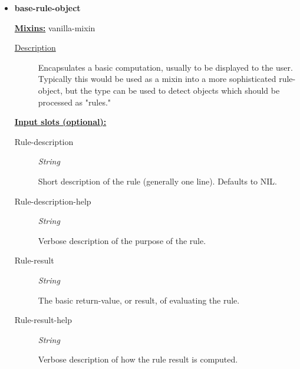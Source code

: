 \documentclass [11pt]{book}
\begin{document}
\begin{itemize}

\item {}
\label{prim:base-rule-object}
\textbf{base-rule-object}


\textbf{
\underline{Mixins:}} vanilla-mixin





\begin{description}

\item [
\underline{Description}]


Encapsulates a basic computation, usually to be displayed to the user.
Typically this would be used as a mixin into a more sophisticated rule-object, but the type can be
 used to detect objects which should be processed as "rules."



\end{description}








\textbf{
\underline{Input slots (optional):}}

\begin{description}

\item [Rule-description]
\emph{String}

 Short description of the rule (generally one line). Defaults to NIL.




\item [Rule-description-help]
\emph{String}

 Verbose description of the purpose of the rule.




\item [Rule-result]
\emph{String}

 The basic return-value, or result, of evaluating the rule.




\item [Rule-result-help]
\emph{String}

 Verbose description of how the rule result is computed.





\end{description}
\end{itemize}
\end{document}
